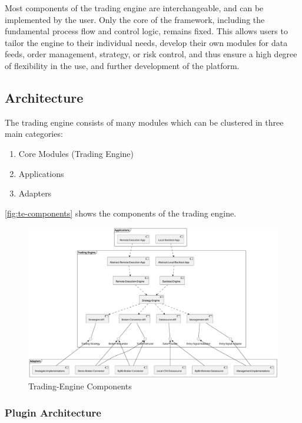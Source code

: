 \noindent
Most components of the trading engine are interchangeable, and can be implemented by the user.
Only the core of the framework, including the fundamental process flow and control logic, remains fixed.
This allows users to tailor the engine to their individual needs, develop their own modules for data feeds, order management, strategy, or risk control, and thus ensure a high degree of flexibility in the use, and further development of the platform.

\subsection{Architecture}

The trading engine consists of many modules which can be clustered in three main categories:

\begin{enumerate}
    \item Core Modules (Trading Engine)
    \item Applications
    \item Adapters
\end{enumerate}

\noindent
\autoref{fig:te-components} shows the components of the trading engine.

\begin{figure}[H]
    \centering
    \includegraphics[width=\textwidth]{images/trading-engine/trading-engine-components}
    \caption{Trading-Engine Components}
    \label{fig:te-components}
\end{figure}

\subsubsection{Plugin Architecture}

